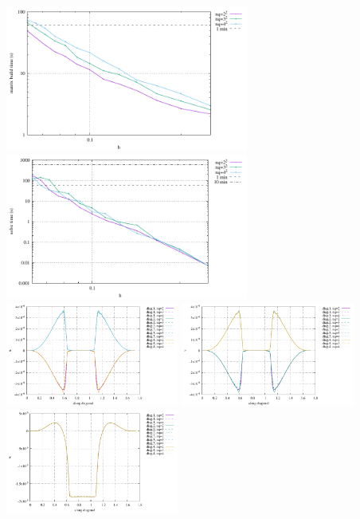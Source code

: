 \begin{center}
\includegraphics[width=8cm]{python_codes/fieldstone_82/RESULTS/bench4/build.pdf}
\includegraphics[width=8cm]{python_codes/fieldstone_82/RESULTS/bench4/solve.pdf}\\
\includegraphics[width=5.7cm]{python_codes/fieldstone_82/RESULTS/bench4/diags_u.pdf}
\includegraphics[width=5.7cm]{python_codes/fieldstone_82/RESULTS/bench4/diags_v.pdf}
\includegraphics[width=5.7cm]{python_codes/fieldstone_82/RESULTS/bench4/diags_w.pdf}\\

\end{center}
